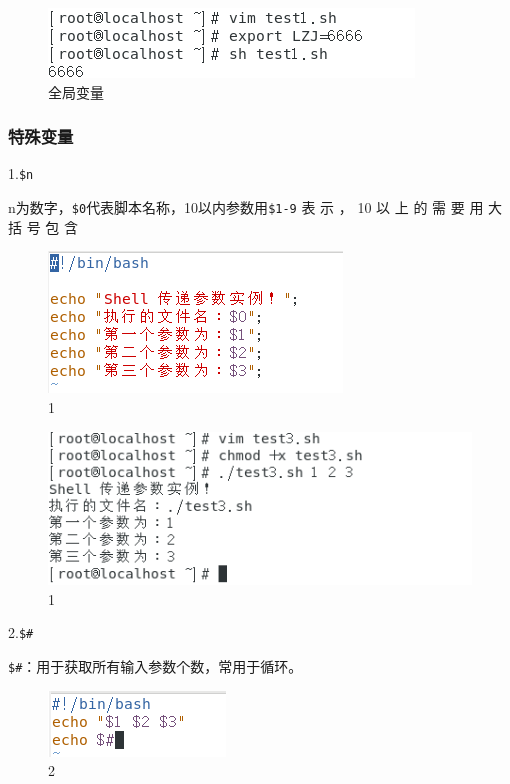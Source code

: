 \documentclass{ctexart}
\begin{document}
	\begin{figure}[H]
		\centering
		\includegraphics{2.7}
		\caption{全局变量}
	\end{figure}
	
	\subsubsection{特殊变量}
	
	1.\verb|$n|
	
	n为数字，\verb|$0|代表脚本名称，10以内参数用\verb|$1-9| 表 示 ， 10 以 上 的 需 要 用 大 括 号 包 含
	
	\begin{figure}[H]
		\centering
		\includegraphics{2.11}
		\caption{1}
	\end{figure}
	
	\begin{figure}[H]
		\centering
		\includegraphics{2.10}
		\caption{1}
	\end{figure}
	
	2.\verb|$#|
	
	\verb|$#|：用于获取所有输入参数个数，常用于循环。
	
	\begin{figure}[H]
		\centering
		\includegraphics{2.12}
		\caption{2}
	\end{figure}
	
\end{document}
